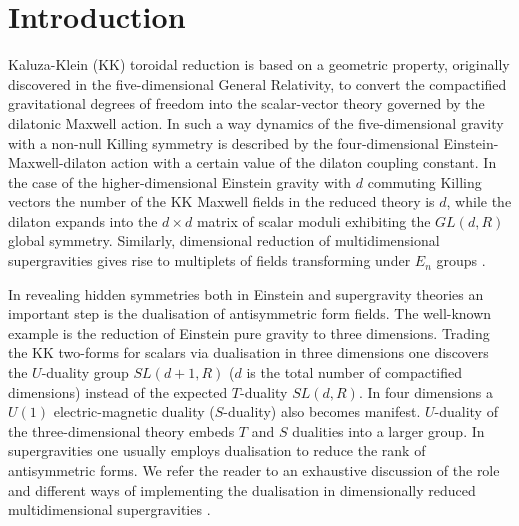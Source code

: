 \documentclass[a4paper,12pt]{article}
\begin{document}

\section{Introduction}
Kaluza-Klein (KK) toroidal reduction is based on a geometric
property, originally discovered in the five-dimensional General
Relativity, to convert the compactified gravitational degrees of
freedom into the scalar-vector theory governed by the dilatonic
Maxwell action. In such a way dynamics of the five-dimensional
gravity with a non-null Killing symmetry is described by the
four-dimensional Einstein-Maxwell-dilaton action with a certain
value of the dilaton coupling constant. In the case of the
higher-dimensional Einstein gravity with $d$ commuting Killing
vectors the number of the KK Maxwell fields in the reduced theory
is $d$, while the dilaton expands into the $d\times d$ matrix of
scalar moduli exhibiting the $GL(d,R)$ global symmetry.
Similarly, dimensional reduction of multidimensional
supergravities gives rise to multiplets of fields transforming
under $E_n$ groups \cite{Ju81}.

In revealing hidden symmetries both in Einstein and supergravity
theories an important step is the dualisation of antisymmetric
form fields. The well-known example is the reduction of
Einstein pure gravity to three dimensions. Trading the KK
two-forms for scalars via dualisation in three dimensions one
discovers the $U$-duality group $SL(d+1,R)$ ($d$ is the total
number of compactified dimensions) instead of the expected
$T$-duality $SL(d,R)$. In four dimensions a $U(1)$
electric-magnetic duality ($S$-duality) also becomes manifest.
$U$-duality of the three-dimensional theory embeds $T$ and $S$
dualities  into a larger group. In supergravities one usually
employs dualisation to reduce the rank of antisymmetric forms.
We refer the reader to an exhaustive discussion of the role and
different ways of implementing the dualisation in dimensionally
reduced multidimensional supergravities
\cite{CrJuLuPo98a,CrJuLuPo98b}.
\end{document}
